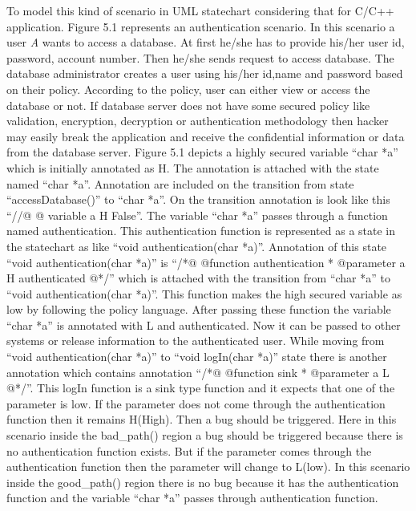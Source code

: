 To model this kind of scenario in UML statechart considering that for C/C++ application. Figure 5.1 represents an authentication scenario. In this scenario a user \emph{A} wants to access a database. At first he/she has to provide his/her user id, password, account number. Then he/she sends request to access database. The database administrator creates a user using his/her id,name and password based on their policy. According to the policy, user can either view or access the database or not. If database server does not have some secured policy like validation, encryption, decryption or authentication methodology then hacker may easily break the application and receive the confidential information or data from the database server. Figure 5.1 depicts a highly secured variable \enquote{char *a} which is initially annotated as H. The annotation is attached with the state named \enquote{char *a}. Annotation are included on the transition from state \enquote{accessDatabase()} to \enquote{char *a}. On the transition annotation is look like this \enquote{//@ @ variable a H False}. The variable \enquote{char *a} passes through a function named authentication. This authentication function is represented as a state in the statechart as like \enquote{void authentication(char *a)}. Annotation of this state \enquote{void authentication(char *a)} is \enquote{/*@ @function authentication
* @parameter a H authenticated @*/} which is attached with the transition from \enquote{char *a} to \enquote{void authentication(char *a)}. This function makes the high secured variable as low by following the policy language. After passing these function the variable \enquote{char *a} is annotated with L and authenticated. Now it can be passed to other systems or release information to the authenticated user. While moving from \enquote{void authentication(char *a)} to \enquote{void logIn(char *a)} state there is another annotation which contains annotation \enquote{/*@ @function sink * @parameter a L @*/}. This logIn function is a sink type function and it expects that one of the parameter is low. If the parameter does not come through the authentication function then it remains H(High). Then a bug should be triggered. Here in this scenario inside the bad\_path() region a bug should be triggered because there is no authentication function exists. But if the parameter comes through the authentication function then the parameter will change to L(low). In this scenario inside the good\_path() region there is no bug because it has the authentication function and the variable \enquote{char *a} passes through authentication function.



